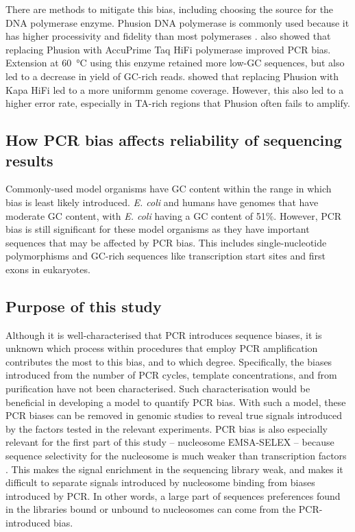 \documentclass[parskip=full, numbers=noenddot]{scrbook}
\begin{document}
There are methods to mitigate this bias, including choosing the source for the DNA polymerase enzyme.  Phusion DNA polymerase is commonly used because it has higher processivity and fidelity than most polymerases \citep{quail_optimal_2012}.  \citet{aird_analyzing_2011} also showed that replacing Phusion with AccuPrime Taq HiFi polymerase improved PCR bias.  Extension at \SI{60}{\celsius} using this enzyme retained more low-GC sequences, but also led to a decrease in yield of GC-rich reads.  \citet{quail_optimal_2012} showed that replacing Phusion with Kapa HiFi led to a more uniformm genome coverage.  However, this also led to a higher error rate, especially in TA-rich regions that Phusion often fails to amplify.

\subsection{How PCR bias affects reliability of sequencing results}
\label{ssec:pcrbias_intro_effects}

Commonly-used model organisms have GC content within the range in which bias is least likely introduced.  \emph{E. coli} and humans have genomes that have moderate GC content, with \emph{E. coli} having a GC content of 51\%.  However, PCR bias is still significant for these model organisms as they have important sequences that may be affected by PCR bias.  This includes single-nucleotide polymorphisms and GC-rich sequences like transcription start sites and first exons in eukaryotes.  %

\subsection{Purpose of this study}
\label{ssec:pcrbias_intro_why}

Although it is well-characterised that PCR introduces sequence biases, it is unknown which process within procedures that employ PCR amplification contributes the most to this bias, and to which degree.  Specifically, the biases introduced from the number of PCR cycles, template concentrations, and from purification have not been characterised.  Such characterisation would be beneficial in developing a model to quantify PCR bias.  With such a model, these PCR biases can be removed in genomic studies to reveal true signals introduced by the factors tested in the relevant experiments.  PCR bias is also especially relevant for the first part of this study -- nucleosome EMSA-SELEX -- because sequence selectivity for the nucleosome is much weaker than transcription factors \citep{struhl_determinants_2013}.  This makes the signal enrichment in the sequencing library weak, and makes it difficult to separate signals introduced by nucleosome binding from biases introduced by PCR.  In other words, a large part of sequences preferences found in the libraries bound or unbound to nucleosomes can come from the PCR-introduced bias.
\end{document}
